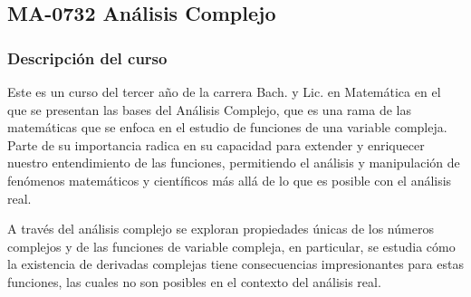 \newpage
\subsection*{MA-0732 Análisis Complejo}

\hypertarget{MA0732}{}
\begin{refsection}
\begin{table}[H]
\end{table}



\subsubsection*{Descripción del curso}

Este es un curso del tercer año de la carrera Bach. y Lic. en Matemática en el que se presentan las bases del Análisis Complejo, que es una rama de las matemáticas que se enfoca en el estudio de funciones de una variable compleja. Parte de su importancia radica en su capacidad para extender y enriquecer nuestro entendimiento de las funciones, permitiendo el análisis y manipulación de fenómenos matemáticos y científicos más allá de lo que es posible con el análisis real. 

A través del análisis complejo se exploran propiedades únicas de los números complejos y de las funciones de variable compleja, en particular, se estudia cómo la existencia de derivadas complejas tiene consecuencias impresionantes para estas funciones, las cuales no son posibles en el contexto del análisis real.


\end{refsection}

